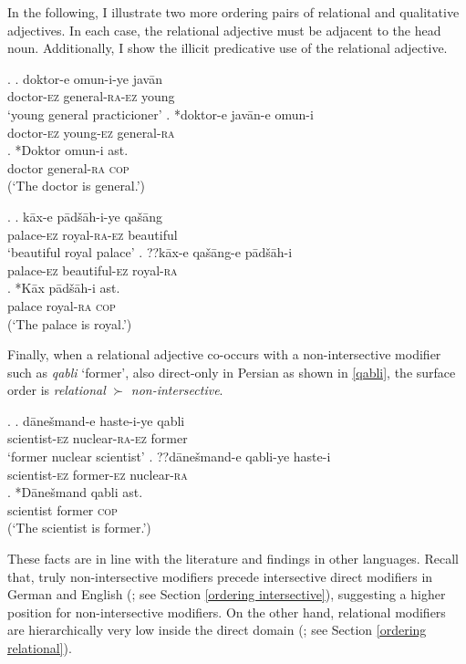 In the following, I illustrate two more ordering pairs of relational and qualitative adjectives. In each case, the relational adjective must be adjacent to the head noun. Additionally, I show the illicit predicative use of the relational adjective.

\ex. \ag. doktor-e omun-i-ye javān\\
doctor-\textsc{ez} general-\textsc{ra-ez} young\\
`young general practicioner'
\bg. *doktor-e javān-e omun-i\\
doctor-\textsc{ez} young-\textsc{ez} general-\textsc{ra}\\
\cg. *Doktor omun-i ast.\\
doctor general-\textsc{ra} \textsc{cop}\\
(`The doctor is general.’)

\ex. \ag. kāx-e pādšāh-i-ye qašāng\\
palace-\textsc{ez} royal-\textsc{ra-ez} beautiful\\
`beautiful royal palace'
\bg. ??kāx-e qašāng-e pādšāh-i\\
palace-\textsc{ez} beautiful-\textsc{ez} royal-\textsc{ra}\\
\cg. *Kāx pādšāh-i ast.\\
palace royal-\textsc{ra} \textsc{cop}\\
(`The palace is royal.’)

Finally, when a relational adjective co-occurs with a non-intersective modifier such as \textit{qabli} `former’, also direct-only in Persian as shown in \ref{qabli}, the surface order is \textit{relational} $\succ$ \textit{non-intersective}. 

\ex. \label{nuclearformer} \ag. dānešmand-e haste-i-ye qabli\\
scientist-\textsc{ez} nuclear-\textsc{ra-ez} former\\
`former nuclear scientist'
\bg. ??dānešmand-e qabli-ye haste-i\\
scientist-\textsc{ez} former-\textsc{ez} nuclear-\textsc{ra}\\

\exg. *Dānešmand qabli ast.\\
scientist former \textsc{cop}\\
(`The scientist is former.’) \label{qabli}

These facts are in line with the literature and findings in other languages. Recall that, truly non-intersective modifiers precede intersective direct modifiers in  German and  English (\citealt{trost:2006:das, panayidou:2013:in}; see Section \ref{ordering intersective}), suggesting a higher position for non-intersective modifiers. On the other hand, relational modifiers are hierarchically very low inside the direct domain (\citealt{bortolotto:2016:RA}; see Section \ref{ordering relational}). 


